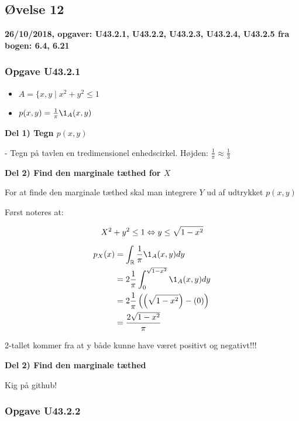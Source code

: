 \horizline

\subsection{Øvelse 12}

\textbf{26/10/2018, opgaver: U43.2.1, U43.2.2, U43.2.3, U43.2.4, U43.2.5 fra bogen: 6.4, 6.21}

\subsubsection{Opgave U43.2.1}

\begin{itemize}
    \item $A= \{x,y \mid x^2 + y^2 \leq 1$
    \item $p(x,y) = \frac{1}{\pi}\1_{A} (x,y)$
\end{itemize}

\textbf{Del 1) Tegn $p(x,y)$}

- Tegn på tavlen en tredimensionel enhedscirkel. Højden: $\frac{1}{\pi} \approx \frac{1}{3}$

\textbf{Del 2) Find den marginale tæthed for $X$}

For at finde den marginale tæthed skal man integrere $Y$ ud af udtrykket $p(x,y)$

Først noteres at:

\begin{equation}
    X^2 + y^2 \leq 1 \Leftrightarrow y \leq \sqrt{1 - x^2} 
\end{equation}

\begin{align}
    p_X (x) &= \int_{\R} \frac{1}{\pi} \1_A (x,y) dy \\
    &=  2 \frac{1}{\pi} \int_0^{\sqrt{1 - x^2}} \1_A (x,y) dy \\
    &= 2 \frac{1}{\pi} \lp\lp\sqrt{1- x^2}\rp - \lp0\rp\rp \\
    &= \frac{2\sqrt{1 - x^2}}{\pi} 
\end{align}


2-tallet kommer fra at y både kunne have været positivt og negativt!!!

\textbf{Del 2) Find den marginale tæthed}

Kig på github!

\subsubsection{Opgave U43.2.2}

